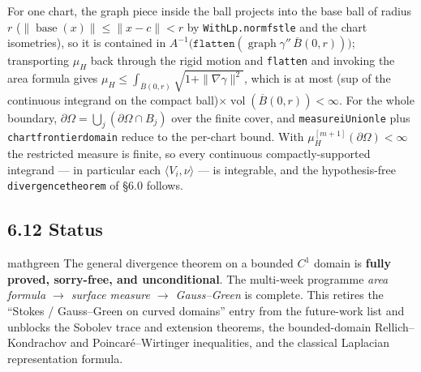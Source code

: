 ﻿\documentclass[12pt, a4paper]{article}
\renewcommand{\_}{\origunderscore\allowbreak}
\theoremstyle{definition}
\theoremstyle{plain}
\begin{document}
For one chart, the graph piece inside the ball projects into the base ball of radius $r$
($\|\operatorname{base}(x)\|\le\|x-c\|<r$ by \texttt{WithLp.norm\_fst\_le} and the chart isometries),
so it is contained in $A^{-1}\big(\texttt{flatten}(\operatorname{graph}\gamma''\,\overline{B}(0,r))\big)$;
transporting $\mu_H$ back through the rigid motion and \texttt{flatten} and invoking the area formula
gives $\mu_H\le\int_{\overline B(0,r)}\sqrt{1+\|\nabla\gamma\|^2}$, which is at most (sup of the
continuous integrand on the compact ball)$\times\operatorname{vol}(\overline B(0,r))<\infty$.  For the
whole boundary, $\partial\Omega=\bigcup_j(\partial\Omega\cap B_j)$ over the finite cover, and
\texttt{measure\_iUnion\_le} plus \texttt{chart\_frontier\_domain} reduce to the per-chart bound.
With $\mu_H^{[m+1]}(\partial\Omega)<\infty$ the restricted measure is finite, so every continuous
compactly-supported integrand --- in particular each $\langle V_i,\nu\rangle$ --- is integrable, and
the hypothesis-free \texttt{divergence\_theorem} of \S6.0 follows.

\subsection{6.12 Status}

\begin{statusbox}{mathgreen}
The general divergence theorem on a bounded $C^1$ domain is \textbf{fully proved, sorry-free, and
unconditional}.  The multi-week programme \emph{area formula $\to$ surface measure $\to$ Gauss--Green}
is complete.  This retires the ``Stokes / Gauss--Green on curved domains'' entry from the future-work
list and unblocks the Sobolev trace and extension theorems, the bounded-domain Rellich--Kondrachov
and Poincar\'e--Wirtinger inequalities, and the classical Laplacian representation formula.
\end{statusbox}
\end{document}
